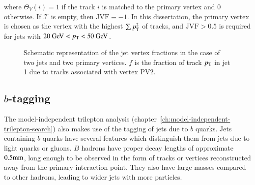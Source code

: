 where $\Theta_V(i)=1$ if the track $i$ is matched to the primary vertex and $0$ otherwise. If $\mathcal{T}$ is empty, then $\mathrm{JVF}\equiv -1$. In this dissertation, the primary vertex is chosen as the vertex with the highest $\sum p_{\text{T}}^2$ of tracks, and $\mathrm{JVF}>0.5$ is required for jets with $20 \GeV<\pt<50 \GeV$. 

\begin{figure}[htbp]
	\centering
	\caption{Schematic representation of the jet vertex fractions in the case of two jets and two primary vertices. $f$ is the fraction of track $p_{\text{T}}$ in jet 1 due to tracks associated with vertex PV2.}
	\label{fig:jvf-cartoon}
\end{figure}


\subsection{$b$-tagging}\label{sec:reco-bjets}
The model-independent trilepton analysis (chapter~\ref{ch:model-independent-trilepton-search}) also makes use of the tagging of jets due to $b$ quarks. Jets containing $b$ quarks have several features which distinguish them from jets due to light quarks or gluons. $B$ hadrons have proper decay lengths of approximate $0.5 \mathrm{mm}$, long enough to be observed in the form of tracks or vertices reconstructed away from the primary interaction point. They also have large masses compared to other hadrons, leading to wider jets with more particles. 

